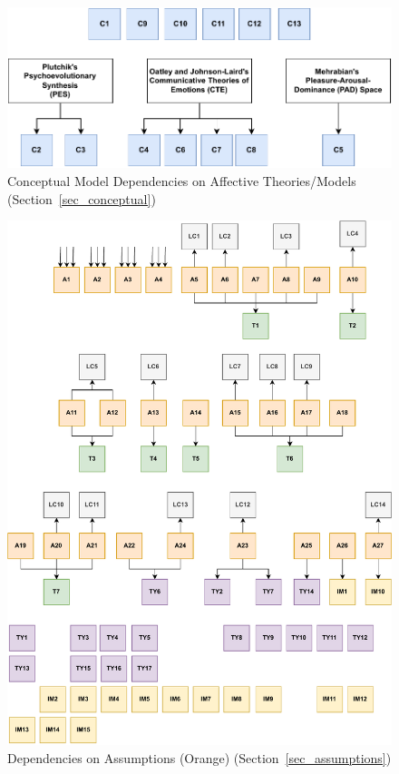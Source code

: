 \vspace*{\fill}
\begin{figure}[tbh]
    \centering
    \includegraphics[width=\linewidth]{figures/theories2concept.pdf}
    \caption[Conceptual Model Dependencies on Affective
    Theories/Models]{Conceptual Model Dependencies on Affective Theories/Models
    (Section~\ref{sec_conceptual})}
    \label{fig:theories2conceptual}
\end{figure}
\vspace*{\fill}

\begin{figure}[tbh]
    \centering
    \includegraphics[height=0.96\textheight]{figures/assumptions2All.pdf}
    \caption[Dependencies on Assumptions]{Dependencies on Assumptions (Orange)
    (Section~\ref{sec_assumptions})}
    \label{fig:A2All}
\end{figure}

